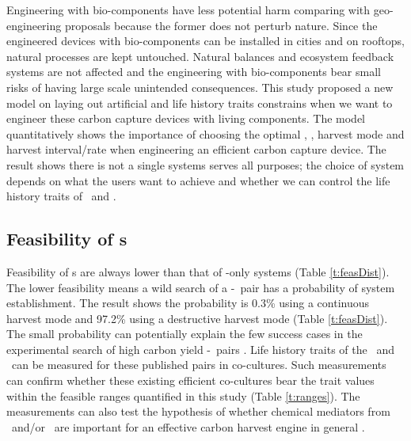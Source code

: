 \documentclass[../thesis.tex]{subfiles} %
\begin{document}
Engineering with bio-components have less potential harm comparing with geo-engineering proposals because the former does not perturb nature.  Since the engineered devices with bio-components can be installed in cities and on rooftops, natural processes are kept untouched.  Natural balances and ecosystem feedback systems are not affected and the engineering with bio-components bear small risks of having large scale unintended consequences.  This study proposed a new model on laying out artificial and life history traits constrains when we want to engineer these carbon capture devices with living components.  The model quantitatively shows the importance of choosing the optimal \phy, \bac, harvest mode and harvest interval/rate when engineering an efficient carbon capture device.  The result shows there is not a single systems serves all purposes; the choice of system depends on what the users want to achieve and whether we can control the life history traits of \phy\ and \bac.

\subsection{Feasibility of \pbs s}
Feasibility of \pbs s are always lower than that of \phy-only systems (Table \ref{t:feasDist}).  The lower feasibility means a wild search of a \phy-\bac\ pair has a probability of system establishment.  The result shows the probability is 0.3\% using a continuous harvest mode and 97.2\% using a destructive harvest mode (Table \ref{t:feasDist}).  The small probability can potentially explain the few success cases in the experimental search of high carbon yield \phy-\bac\ pairs \autocite{fuentes2016impact}.  Life history traits of the \phy\ and \bac\ can be measured for these published pairs in co-cultures.  Such measurements can confirm whether these existing efficient co-cultures bear the trait values within the feasible ranges quantified in this study (Table \ref{t:ranges}).  The measurements can also test the hypothesis of whether chemical mediators from \phy\ and/or \bac\ are important for an effective carbon harvest engine in general \autocite{rivas2010interactions,amin2009photolysis,fuentes2016impact}.
\end{document}
